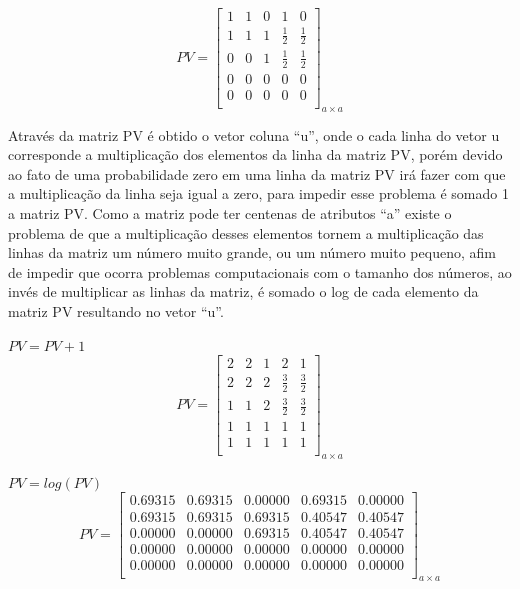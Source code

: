$$PV=\left[
\begin{array}{ccccc}
1 & 1 & 0 & 1 & 0 \\
1 & 1 & 1 & \frac{1}{2} & \frac{1}{2} \\
0 & 0 & 1 & \frac{1}{2} & \frac{1}{2} \\
0 & 0 & 0 & 0 & 0 \\
0 & 0 & 0 & 0 & 0 \\
\end{array}
\right]_{a \times a}$$

Através da matriz PV é obtido o vetor coluna ``u'', onde o cada linha
do vetor u corresponde a multiplicação dos elementos da linha da matriz
PV, porém devido ao fato de uma probabilidade zero em uma linha da matriz
PV irá fazer com que a multiplicação da linha seja igual a zero, para
impedir esse problema é somado 1 a matriz PV. Como a matriz pode ter
centenas de atributos ``a'' existe o problema de que a multiplicação
desses elementos tornem a multiplicação das linhas da matriz um número
muito grande, ou um número muito pequeno, afim de impedir que ocorra
problemas computacionais com o tamanho dos números, ao invés de multiplicar
as linhas da matriz, é somado o log de cada elemento da matriz PV resultando
no vetor ``u''.

\begin{center}
$PV = PV + 1$
$$PV=\left[
\begin{array}{ccccc}
2 & 2 & 1 & 2 & 1 \\
2 & 2 & 2 & \frac{3}{2} & \frac{3}{2} \\
1 & 1 & 2 & \frac{3}{2} & \frac{3}{2} \\
1 & 1 & 1 & 1 & 1 \\
1 & 1 & 1 & 1 & 1 \\
\end{array}
\right]_{a \times a}$$
\end{center}

\begin{center}
$PV = log(PV)$
$$PV=\left[
\begin{array}{ccccc}
0.69315 & 0.69315 & 0.00000 & 0.69315 & 0.00000 \\
0.69315 & 0.69315 & 0.69315 & 0.40547 & 0.40547 \\
0.00000 & 0.00000 & 0.69315 & 0.40547 & 0.40547 \\
0.00000 & 0.00000 & 0.00000 & 0.00000 & 0.00000 \\
0.00000 & 0.00000 & 0.00000 & 0.00000 & 0.00000 \\
\end{array}
\right]_{a \times a}$$
\end{center}

